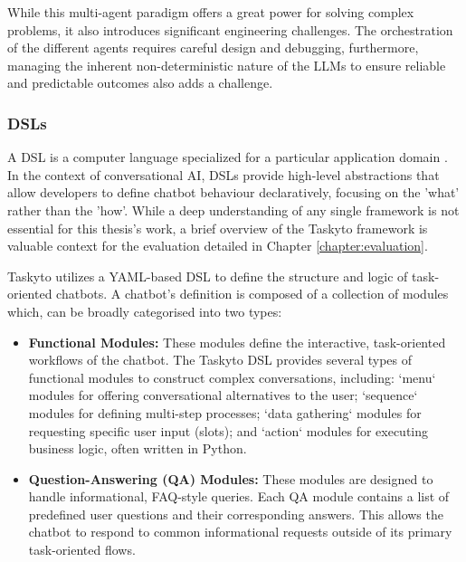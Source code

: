 While this multi-agent paradigm offers a great power for solving complex problems,
it also introduces significant engineering challenges.
The orchestration of the different agents requires careful design and debugging,
furthermore, managing the inherent non-deterministic nature
of the \acp{LLM} to ensure reliable and predictable outcomes also adds a challenge.

\subsubsection{\aclp{DSL}}

A \acl{DSL} is a computer language
specialized for a particular application domain
\autocite{wasowskiDomainSpecificLanguagesEffective2023}.
In the context of conversational AI,
\acp{DSL} provide high-level abstractions
that allow developers to define chatbot behaviour declaratively,
focusing on the 'what' rather than the 'how'.
While a deep understanding of any single framework
is not essential for this thesis's work,
a brief overview of the Taskyto framework
\autocite{sanchezcuadradoAutomatingDevelopmentTaskoriented2024}
is valuable context for the evaluation
detailed in Chapter \ref{chapter:evaluation}.

Taskyto utilizes a YAML-based \ac{DSL}
to define the structure and logic of task-oriented chatbots.
A chatbot's definition is composed of a collection of modules which,
can be broadly categorised into two types:


\begin{itemize}
    \item \textbf{Functional Modules:}
      These modules define the interactive,
      task-oriented workflows of the chatbot.
      The Taskyto DSL provides several types of functional modules
      to construct complex conversations, including:
      `menu` modules for offering conversational alternatives to the user;
      `sequence` modules for defining multi-step processes;
      `data gathering` modules for requesting specific user input (slots);
      and `action` modules for executing business logic, often written in Python.

    \item \textbf{Question-Answering (QA) Modules:}
      These modules are designed to handle informational, FAQ-style queries.
      Each QA module contains
      a list of predefined user questions
      and their corresponding answers.
      This allows the chatbot to respond
      to common informational requests
      outside of its primary task-oriented flows.
\end{itemize}

